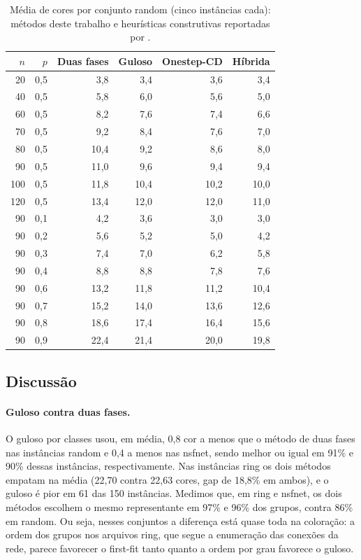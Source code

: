\documentclass[12pt]{article}
\begin{document}
\begin{table}[ht]
  \centering
  \caption{Média de cores por conjunto random (cinco instâncias cada):
    métodos deste trabalho e heurísticas construtivas reportadas por
    \cite{fritz2013}.}
  \label{tab:onestep}
  \small
  \begin{tabular}{rrrrrr}
    \toprule
    $n$ & $p$ & Duas fases & Guloso & Onestep-CD & Híbrida \\
    \midrule
    20  & 0,5 & 3,8  & 3,4  & 3,6  & 3,4  \\
    40  & 0,5 & 5,8  & 6,0  & 5,6  & 5,0  \\
    60  & 0,5 & 8,2  & 7,6  & 7,4  & 6,6  \\
    70  & 0,5 & 9,2  & 8,4  & 7,6  & 7,0  \\
    80  & 0,5 & 10,4 & 9,2  & 8,6  & 8,0  \\
    90  & 0,5 & 11,0 & 9,6  & 9,4  & 9,4  \\
    100 & 0,5 & 11,8 & 10,4 & 10,2 & 10,0 \\
    120 & 0,5 & 13,4 & 12,0 & 12,0 & 11,0 \\
    90  & 0,1 & 4,2  & 3,6  & 3,0  & 3,0  \\
    90  & 0,2 & 5,6  & 5,2  & 5,0  & 4,2  \\
    90  & 0,3 & 7,4  & 7,0  & 6,2  & 5,8  \\
    90  & 0,4 & 8,8  & 8,8  & 7,8  & 7,6  \\
    90  & 0,6 & 13,2 & 11,8 & 11,2 & 10,4 \\
    90  & 0,7 & 15,2 & 14,0 & 13,6 & 12,6 \\
    90  & 0,8 & 18,6 & 17,4 & 16,4 & 15,6 \\
    90  & 0,9 & 22,4 & 21,4 & 20,0 & 19,8 \\
    \bottomrule
  \end{tabular}
\end{table}

\subsection{Discussão}

\paragraph{Guloso contra duas fases.} O guloso por classes usou, em média,
0,8 cor a menos que o método de duas fases nas instâncias random e 0,4 a menos
nas nsfnet, sendo melhor ou igual em 91\% e 90\% dessas instâncias,
respectivamente. Nas instâncias ring os dois métodos empatam na média
(22,70 contra 22,63 cores, gap de 18,8\% em ambos), e o guloso é pior em 61
das 150 instâncias. Medimos que, em ring e nsfnet, os dois métodos escolhem o
mesmo representante em 97\% e 96\% dos grupos, contra 86\% em random. Ou seja,
nesses conjuntos a diferença está quase toda na coloração: a ordem dos grupos
nos arquivos ring, que segue a enumeração das conexões da rede, parece
favorecer o first-fit tanto quanto a ordem por grau favorece o guloso.
\end{document}
